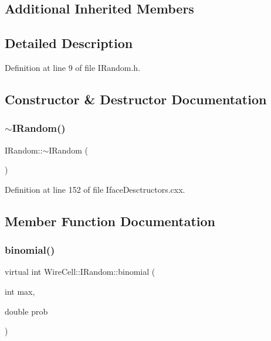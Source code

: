 \subsection*{Additional Inherited Members}


\subsection{Detailed Description}


Definition at line 9 of file I\+Random.\+h.



\subsection{Constructor \& Destructor Documentation}
\mbox{\label{class_wire_cell_1_1_i_random_a0423914f3cfd21bc8012a9aab26508ed}} 
\subsubsection{\texorpdfstring{$\sim$\+I\+Random()}{~IRandom()}}
{\footnotesize\ttfamily I\+Random\+::$\sim$\+I\+Random (\begin{DoxyParamCaption}{ }\end{DoxyParamCaption})\hspace{0.3cm}{\ttfamily [virtual]}}



Definition at line 152 of file Iface\+Desctructors.\+cxx.



\subsection{Member Function Documentation}
\mbox{\label{class_wire_cell_1_1_i_random_a4cb94097ddbd0edda3ad891b6d01b37d}} 
\subsubsection{\texorpdfstring{binomial()}{binomial()}}
{\footnotesize\ttfamily virtual int Wire\+Cell\+::\+I\+Random\+::binomial (\begin{DoxyParamCaption}\item[{int}]{max,  }\item[{double}]{prob }\end{DoxyParamCaption})\hspace{0.3cm}{\ttfamily [pure virtual]}}



